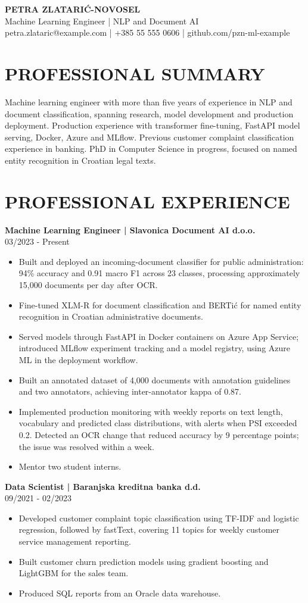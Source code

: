 \documentclass[11pt,a4paper]{article}
\newcommand{\cvsection}[1]{\section*{#1}}
\begin{document}
{\LARGE\bfseries\color{primarycolor} PETRA ZLATARIĆ-NOVOSEL}\\[0.4em]
{\large Machine Learning Engineer | NLP and Document AI}\\[0.3em]
{\small petra.zlataric@example.com | +385 55 555 0606 | github.com/pzn-ml-example}

\cvsection{PROFESSIONAL SUMMARY}
Machine learning engineer with more than five years of experience in NLP and document classification, spanning research, model development and production deployment. Production experience with transformer fine-tuning, FastAPI model serving, Docker, Azure and MLflow. Previous customer complaint classification experience in banking. PhD in Computer Science in progress, focused on named entity recognition in Croatian legal texts.

\cvsection{PROFESSIONAL EXPERIENCE}
\textbf{Machine Learning Engineer | Slavonica Document AI d.o.o.}\\
03/2023 - Present
\begin{itemize}
\item Built and deployed an incoming-document classifier for public administration: 94\% accuracy and 0.91 macro F1 across 23 classes, processing approximately 15,000 documents per day after OCR.
\item Fine-tuned XLM-R for document classification and BERTić for named entity recognition in Croatian administrative documents.
\item Served models through FastAPI in Docker containers on Azure App Service; introduced MLflow experiment tracking and a model registry, using Azure ML in the deployment workflow.
\item Built an annotated dataset of 4,000 documents with annotation guidelines and two annotators, achieving inter-annotator kappa of 0.87.
\item Implemented production monitoring with weekly reports on text length, vocabulary and predicted class distributions, with alerts when PSI exceeded 0.2. Detected an OCR change that reduced accuracy by 9 percentage points; the issue was resolved within a week.
\item Mentor two student interns.
\end{itemize}

\textbf{Data Scientist | Baranjska kreditna banka d.d.}\\
09/2021 - 02/2023
\begin{itemize}
\item Developed customer complaint topic classification using TF-IDF and logistic regression, followed by fastText, covering 11 topics for weekly customer service management reporting.
\item Built customer churn prediction models using gradient boosting and LightGBM for the sales team.
\item Produced SQL reports from an Oracle data warehouse.
\end{itemize}
\end{document}
